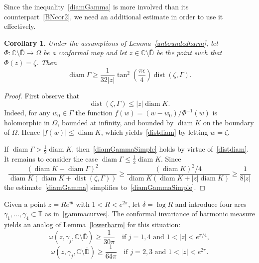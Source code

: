 \documentclass[11pt]{amsart}
\newtheorem{corollary}[theorem]{Corollary}
\theoremstyle{remark}
\numberwithin{equation}{section}
\newcommand{\C}{\mathbb{C}}
\newcommand{\DD}{\mathbb{D}}
\newcommand{\abs}[1]{\lvert#1\rvert}
\DeclareMathOperator{\dist}{dist}
\DeclareMathOperator{\diam}{diam}
\begin{document}
Since the inequality~\eqref{diamGamma} is more involved than its counterpart~\eqref{BNcor2}, we need an  additional estimate in order to use it effectively. 

\begin{corollary}\label{distdiamlem} Under the assumptions of Lemma~\ref{unboundedharm}, let $\Phi\colon \C\setminus \overline{\mathbb D}\to \Omega$ be a conformal map and let $z \in \C\setminus \overline{\mathbb D}$ be the point such that $\Phi(z)=\zeta$. Then 
\begin{equation}\label{diamGammaSimple}
\diam\Gamma \ge \frac{1}{32\abs{z}}\tan^2 \left(\frac{\pi \epsilon}{4} \right) \dist(\zeta,\Gamma).
\end{equation}
\end{corollary}
\begin{proof}  First observe that 
\begin{equation}\label{distdiam}
\dist(\zeta, \Gamma)\le \abs{z}\diam K.
\end{equation}
Indeed, for any $w_0\in \Gamma$ the function $f(w) = (w-w_0)/\Phi^{-1}(w)$ is holomorphic in $\Omega$, bounded at infinity, and bounded by $\diam K$ on the boundary of $\Omega$. Hence $\abs{f(w)}\le \diam K$, which yields~\eqref{distdiam} by letting $w=\zeta$. 

If $\diam\Gamma > \frac12 \diam K$, then~\eqref{diamGammaSimple} holds by virtue of~\eqref{distdiam}. It remains to consider the case $\diam\Gamma \le \frac12 \diam K$. Since 
\[
\frac{(\diam K - \diam\Gamma)^2}{\diam K(\diam K+\dist(\zeta, \Gamma))} 
\ge \frac{(\diam K)^2/4}{\diam K(\diam K+\abs{z}\diam K)} \ge \frac{1}{8\abs{z}} 
\]
the estimate~\eqref{diamGamma} simplifies to~\eqref{diamGammaSimple}. 
\end{proof}

Given a point $z=R e^{i\theta}$ with $1<R<e^{2\pi}$, let $\delta = \log R$ and introduce four arcs $\gamma_1,\dots,\gamma_4\subset\mathbb T$ as in~\eqref{gammacurves}. The conformal invariance of harmonic measure yields an analog of Lemma~\ref{lowerharm} for this situation: 
\begin{equation}\label{lowerharm1e}
\omega(z, \gamma_j, \C\setminus \overline{\DD}) \ge \frac{1}{30\pi} \quad \text{if $j=1,4$ and $1<|z|<e^{\pi/4}$},
\end{equation}
\begin{equation}\label{lowerharm2e}
\omega(z, \gamma_j, \C\setminus \overline{\DD}) \ge \frac{1}{64\pi} \quad \text{if $j=2,3$ and $1<|z|<e^{2\pi}$}.
\end{equation}
\end{document}
